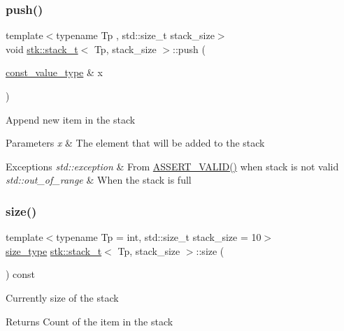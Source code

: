 \subsubsection{\texorpdfstring{push()}{push()}}
{\footnotesize\ttfamily template$<$typename Tp , std\+::size\+\_\+t stack\+\_\+size$>$ \\
void \hyperlink{classstk_1_1stack__t}{stk\+::stack\+\_\+t}$<$ Tp, stack\+\_\+size $>$\+::push (\begin{DoxyParamCaption}\item[{\hyperlink{classstk_1_1stack__t_a27d586bc06e0faf30a2a980cd8ffd125}{const\+\_\+value\+\_\+type} \&}]{x }\end{DoxyParamCaption})}

Append new item in the stack 
\begin{DoxyParams}{Parameters}
{\em x} & The element that will be added to the stack \\
\hline
\end{DoxyParams}

\begin{DoxyExceptions}{Exceptions}
{\em std\+::exception} & From \hyperlink{stack_8h_a4ad7af85cae2910ffcf6bfbcb8278886}{A\+S\+S\+E\+R\+T\+\_\+\+V\+A\+L\+I\+D()} when stack is not valid \\
\hline
{\em std\+::out\+\_\+of\+\_\+range} & When the stack is full \\
\hline
\end{DoxyExceptions}
\mbox{\label{classstk_1_1stack__t_a50dbd2e6626510af69ba1f38882ca1b5}} 
\subsubsection{\texorpdfstring{size()}{size()}}
{\footnotesize\ttfamily template$<$typename Tp  = int, std\+::size\+\_\+t stack\+\_\+size = 10$>$ \\
\hyperlink{classstk_1_1stack__t_ade199c494a8e4455f76cc04faf138ed8}{size\+\_\+type} \hyperlink{classstk_1_1stack__t}{stk\+::stack\+\_\+t}$<$ Tp, stack\+\_\+size $>$\+::size (\begin{DoxyParamCaption}{ }\end{DoxyParamCaption}) const\hspace{0.3cm}{\ttfamily [inline]}}

Currently size of the stack \begin{DoxyReturn}{Returns}
Count of the item in the stack 
\end{DoxyReturn}
\mbox{\label{classstk_1_1stack__t_a4c8dca98c8f18b9d60398ac75aba5af7}} 
